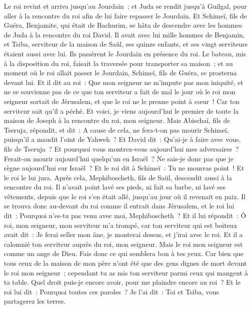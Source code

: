 \begin{multicols}{2}
Le roi revint et arriva jusqu'au Jourdain~; et Juda se rendit jusqu'à Guilgal, pour aller à la rencontre du roi afin de lui faire repasser le Jourdain.
Et Schimeï, fils de Guéra, Benjamite, qui était de Bachurim, se hâta de descendre avec les hommes de Juda à la rencontre du roi David.
Il avait avec lui mille hommes de Benjamin, et Tsiba, serviteur de la maison de Saül, ses quinze enfants, et ses vingt serviteurs étaient aussi avec lui. Ils passèrent le Jourdain en présence du roi.
Le bateau, mis à la disposition du roi, faisait la traversée pour transporter sa maison~; et au moment où le roi allait passer le Jourdain, Schimeï, fils de Guéra, se prosterna devant lui.
Et il dit au roi~: Que mon seigneur ne m'impute pas mon iniquité, et ne se souvienne pas de ce que ton serviteur a fait de mal le jour où le roi mon seigneur sortait de Jérusalem, et que le roi ne le prenne point à cœur~!
Car ton serviteur sait qu'il a péché. Et voici, je viens aujourd'hui le premier de toute la maison de Joseph à la rencontre du roi, mon seigneur.
Mais Abischaï, fils de Tseruja, répondit, et dit~: A cause de cela, ne fera-t-on pas mourir Schimeï, puisqu'il a maudit l'oint de Yahweh~?
Et David dit~: Qu'ai-je à faire avec vous, fils de Tseruja~? Et pourquoi vous montrez-vous aujourd'hui mes adversaires~? Ferait-on mourir aujourd'hui quelqu'un en Israël~? Ne sais-je donc pas que je règne aujourd'hui sur Israël~?
Et le roi dit à Schimeï~: Tu ne mourras point~! Et le roi le lui jura.
Après cela, Mephiboscheth, fils de Saül, descendit aussi à la rencontre du roi. Il n'avait point lavé ses pieds, ni fait sa barbe, ni lavé ses vêtements, depuis que le roi s'en était allé, jusqu'au jour où il revenait en paix.
Il se trouva donc au-devant du roi comme il entrait dans Jérusalem, et le roi lui dit~: Pourquoi n'es-tu pas venu avec moi, Mephiboscheth~?
Et il lui répondit~: Ô roi, mon seigneur, mon serviteur m'a trompé, car ton serviteur qui est boiteux avait dit~: Je ferai seller mon âne, je monterai dessus, et j'irai avec le roi.
Et il a calomnié ton serviteur auprès du roi, mon seigneur. Mais le roi mon seigneur est comme un ange de Dieu. Fais donc ce qui semblera bon à tes yeux.
Car bien que tous ceux de la maison de mon père n'ont été que des gens dignes de mort devant le roi mon seigneur~; cependant tu as mis ton serviteur parmi ceux qui mangent à ta table. Quel droit puis-je encore avoir, pour me plaindre encore au roi~?
Et le roi lui dit~: Pourquoi toutes ces paroles~? Je l'ai dit~: Toi et Tsiba, vous partagerez les terres.

\end{multicols}
